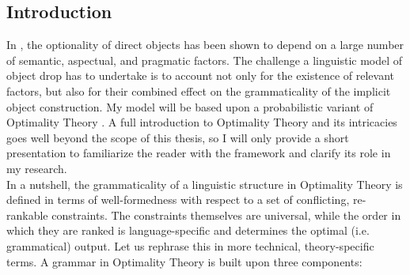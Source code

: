 \subsection{Introduction} In , the optionality of direct objects has been shown to depend on a large number of semantic, aspectual, and pragmatic factors. The challenge a linguistic model of object drop has to undertake is to account not only for the existence of relevant factors, but also for their combined effect on the grammaticality of the implicit object construction. My model will be based upon a probabilistic variant of Optimality Theory \parencite{princesmolensky1993optimality, PrinceSmolensky2008}. A full introduction to Optimality Theory and its intricacies goes well beyond the scope of this thesis, so I will only provide a short presentation to familiarize the reader with the framework and clarify its role in my research.\\ %
In a nutshell, the grammaticality of a linguistic structure in Optimality Theory is defined in terms of well-formedness with respect to a set of conflicting, re-rankable constraints. The constraints themselves are universal, while the order in which they are ranked is language-specific and determines the optimal (i.e. grammatical) output. Let us rephrase this in more technical, theory-specific terms. A grammar in Optimality Theory is built upon three components:
